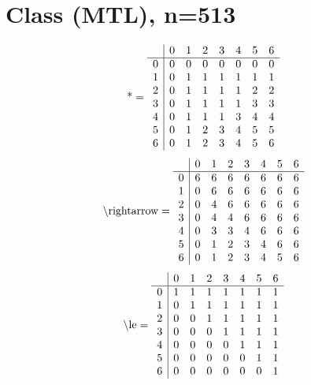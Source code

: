 \documentclass[11pt]{article}
\begin{document}
\section{Class (MTL), n=513}
\[\text{*} = 
\begin{array}{r | r r r r r r r}
 & 0 & 1 & 2 & 3 & 4 & 5 & 6 \\ \hline
0 & 0 & 0 & 0 & 0 & 0 & 0 & 0 \\
1 & 0 & 1 & 1 & 1 & 1 & 1 & 1 \\
2 & 0 & 1 & 1 & 1 & 1 & 2 & 2 \\
3 & 0 & 1 & 1 & 1 & 1 & 3 & 3 \\
4 & 0 & 1 & 1 & 1 & 3 & 4 & 4 \\
5 & 0 & 1 & 2 & 3 & 4 & 5 & 5 \\
6 & 0 & 1 & 2 & 3 & 4 & 5 & 6 \\
\end{array}
\]
\[\text{\textbackslash rightarrow} = 
\begin{array}{r | r r r r r r r}
 & 0 & 1 & 2 & 3 & 4 & 5 & 6 \\ \hline
0 & 6 & 6 & 6 & 6 & 6 & 6 & 6 \\
1 & 0 & 6 & 6 & 6 & 6 & 6 & 6 \\
2 & 0 & 4 & 6 & 6 & 6 & 6 & 6 \\
3 & 0 & 4 & 4 & 6 & 6 & 6 & 6 \\
4 & 0 & 3 & 3 & 4 & 6 & 6 & 6 \\
5 & 0 & 1 & 2 & 3 & 4 & 6 & 6 \\
6 & 0 & 1 & 2 & 3 & 4 & 5 & 6 \\
\end{array}
\]
\[\text{\textbackslash le} = 
\begin{array}{r | r r r r r r r}
 & 0 & 1 & 2 & 3 & 4 & 5 & 6 \\ \hline
0 & 1 & 1 & 1 & 1 & 1 & 1 & 1 \\
1 & 0 & 1 & 1 & 1 & 1 & 1 & 1 \\
2 & 0 & 0 & 1 & 1 & 1 & 1 & 1 \\
3 & 0 & 0 & 0 & 1 & 1 & 1 & 1 \\
4 & 0 & 0 & 0 & 0 & 1 & 1 & 1 \\
5 & 0 & 0 & 0 & 0 & 0 & 1 & 1 \\
6 & 0 & 0 & 0 & 0 & 0 & 0 & 1 \\
\end{array}
\]
\end{document}
